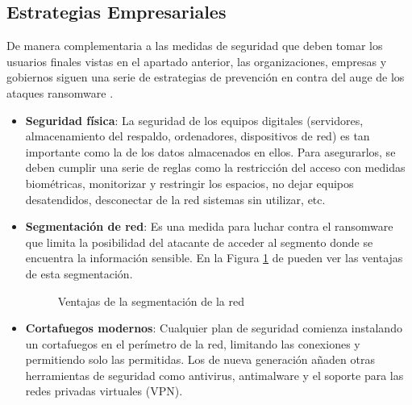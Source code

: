 \subsection{Estrategias Empresariales}
\noindent De manera complementaria a las medidas de seguridad que deben tomar los usuarios finales vistas en el apartado anterior, las organizaciones, empresas y gobiernos siguen una serie de estrategias de prevención en contra del auge de los ataques ransomware \cite{ransommasive}. 

\begin{itemize}
    \item \textbf{Seguridad física}: La seguridad de los equipos digitales (servidores, almacenamiento del respaldo, ordenadores, dispositivos de red) es tan importante como la de los datos almacenados en ellos. Para asegurarlos, se deben cumplir una serie de reglas como la restricción del acceso con medidas biométricas, monitorizar y restringir los espacios, no dejar equipos desatendidos, desconectar de la red sistemas sin utilizar, etc. 
    \item \textbf{Segmentación de red}: Es una medida para luchar contra el ransomware que limita la posibilidad del atacante de acceder al segmento donde se encuentra la información sensible. En la Figura \ref{fig:im11} de pueden ver las ventajas de esta segmentación.
    \begin{figure}[htb]
    \begin{center}
    {}
    \end{center}
    \caption{Ventajas de la segmentación de la red}
    \label{fig:im11}
    \end{figure}
    \item \textbf{Cortafuegos modernos}: Cualquier plan de seguridad comienza instalando un cortafuegos en el perímetro de la red, limitando las conexiones y permitiendo solo las permitidas. Los de nueva generación añaden otras herramientas de seguridad como antivirus, antimalware y el soporte para las redes privadas virtuales (\gls{VPN}).

\end{itemize}
